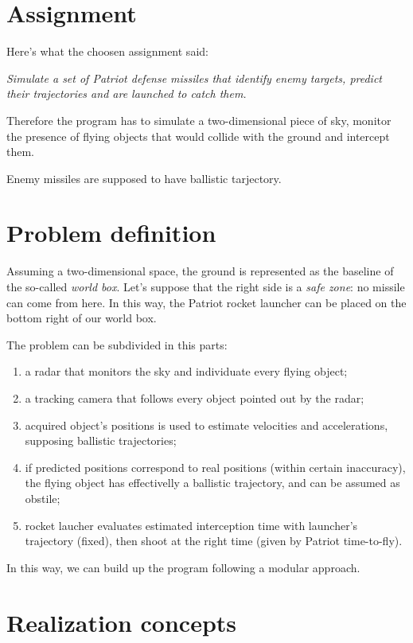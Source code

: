 \documentclass[notitlepage,a4paper,11pt]{article} %
\begin{document}
\section{Assignment}

	Here's what the choosen assignment said:
	\begin{displayquote}
	\emph{Simulate a set of Patriot defense missiles that identify enemy targets, predict their trajectories and are launched to catch them.}
	\end{displayquote}
	Therefore the program has to simulate a two-dimensional piece of sky, monitor the presence of flying objects that would collide with the ground and intercept them.

	Enemy missiles are supposed to have ballistic tarjectory.

\section{Problem definition}

	Assuming a two-dimensional space, the ground is represented as the baseline of the so-called \emph{world box}. Let's suppose that the right side is a \emph{safe zone}: no missile can come from here. In this way, the Patriot rocket launcher can be placed on the bottom right of our world box.

	The problem can be subdivided in this parts:
	\begin{enumerate}
		\item a radar that monitors the sky and individuate every flying object;
		\item a tracking camera that follows every object pointed out by the radar;
		\item acquired object's positions is used to estimate velocities and accelerations, supposing ballistic trajectories;
		\item if predicted positions correspond to real positions (within certain inaccuracy), the flying object has effectivelly a ballistic trajectory, and can be assumed as obstile;
		\item rocket laucher evaluates estimated interception time with launcher's trajectory (fixed), then shoot at the right time (given by Patriot time-to-fly).
	\end{enumerate}

	In this way, we can build up the program following a modular approach.

\section{Realization concepts}
\end{document}
